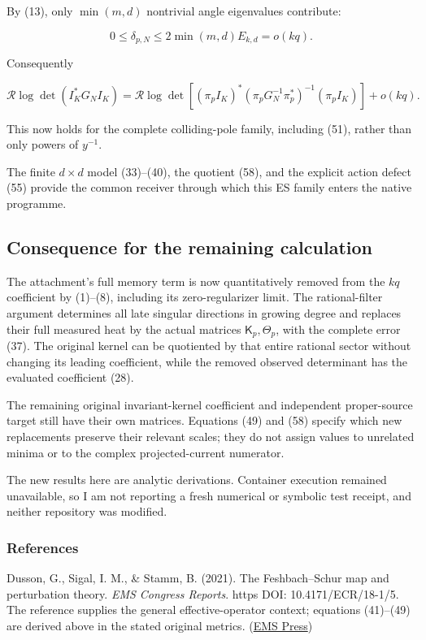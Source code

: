 \documentclass[11pt]{article}
\begin{document}
By (13), only \(\min(m,d)\) nontrivial angle eigenvalues contribute:

\[
0\le\delta_{p,N}\le2\min(m,d)E_{k,d}=o(kq).
\]

Consequently

\[
\boxed{
\mathcal R\log\det(I_K^*G_NI_K)
=
\mathcal R\log\det\!\left[
(\pi_pI_K)^*
(\pi_pG_N^{-1}\pi_p^*)^{-1}
(\pi_pI_K)
\right]
+o(kq).
}
\tag{58}
\]

This now holds for the complete colliding-pole family, including (51), rather than only powers of \(y^{-1}\).

The finite \(d\times d\) model (33)--(40), the quotient (58), and the explicit action defect (55) provide the common receiver through which this ES family enters the native programme.

\subsection{Consequence for the remaining calculation}\label{consequence-for-the-remaining-calculation}

The attachment's full memory term is now quantitatively removed from the \(kq\) coefficient by (1)--(8), including its zero-regularizer limit. The rational-filter argument determines all late singular directions in growing degree and replaces their full measured heat by the actual matrices \(\mathsf K_p,\Theta_p\), with the complete error (37). The original kernel can be quotiented by that entire rational sector without changing its leading coefficient, while the removed observed determinant has the evaluated coefficient (28).

The remaining original invariant-kernel coefficient and independent proper-source target still have their own matrices. Equations (49) and (58) specify which new replacements preserve their relevant scales; they do not assign values to unrelated minima or to the complex projected-current numerator.

The new results here are analytic derivations. Container execution remained unavailable, so I am not reporting a fresh numerical or symbolic test receipt, and neither repository was modified.

\subsubsection{References}\label{references}

Dusson, G., Sigal, I. M., \& Stamm, B. (2021). The Feshbach--Schur map and perturbation theory. \emph{EMS Congress Reports}. https DOI: 10.4171/ECR/18-1/5. The reference supplies the general effective-operator context; equations (41)--(49) are derived above in the stated original metrics. (\href{https://ems.press/books/ecr/187/3518}{EMS Press})
\end{document}
